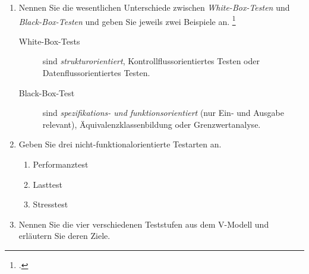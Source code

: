 \documentclass{bschlangaul-aufgabe}
\begin{document}

\begin{enumerate}


\item Nennen Sie die wesentlichen Unterschiede zwischen
\emph{White-Box-Testen} und \emph{Black-Box-Testen} und geben Sie
jeweils zwei Beispiele an.
\footcite{sosy:ab:7}

\begin{bAntwort}
\begin{description}
\item[White-Box-Tests]

sind \emph{strukturorientiert}, \zB
Kontrollflussorientiertes Testen oder Datenflussorientiertes Testen.

\item[Black-Box-Test]

sind \emph{spe\-zifi\-kations- und funktionsorientiert} (nur Ein- und
Ausgabe relevant), \zB Äquivalenzklassenbildung oder Grenzwertanalyse.
\end{description}
\end{bAntwort}


\item Geben Sie drei nicht-funktionalorientierte Testarten an.

\begin{bAntwort}
\begin{enumerate}
\item Performanztest
\item Lasttest
\item Stresstest
\end{enumerate}
\end{bAntwort}


\item Nennen Sie die vier verschiedenen Teststufen aus dem
V-Modell und erläutern Sie deren Ziele.


\end{enumerate}
\end{document}
